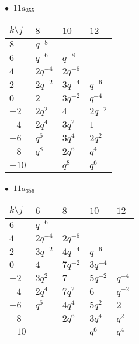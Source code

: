 \begin{minipage}{\linewidth}
$\bullet\ $ $11a_{355}$ \vspace{0.5em} \\
\begin{tabular}{l|lll}
$k \setminus j$ & $8$ & $10$ & $12$ \\
\hline
$8$ & $q^{-8}$ &  &  \\
$6$ & $q^{-6}$ & $q^{-8}$ &  \\
$4$ & $2q^{-4}$ & $2q^{-6}$ &  \\
$2$ & $2q^{-2}$ & $3q^{-4}$ & $q^{-6}$ \\
$0$ & $2$ & $3q^{-2}$ & $q^{-4}$ \\
$-2$ & $2q^{2}$ & $4$ & $2q^{-2}$ \\
$-4$ & $2q^{4}$ & $3q^{2}$ & $1$ \\
$-6$ & $q^{6}$ & $3q^{4}$ & $2q^{2}$ \\
$-8$ & $q^{8}$ & $2q^{6}$ & $q^{4}$ \\
$-10$ &  & $q^{8}$ & $q^{6}$ \\
\end{tabular}
\vspace{2em}
\end{minipage}
%
\begin{minipage}{\linewidth}
$\bullet\ $ $11a_{356}$ \vspace{0.5em} \\
\begin{tabular}{l|llll}
$k \setminus j$ & $6$ & $8$ & $10$ & $12$ \\
\hline
$6$ & $q^{-6}$ &  &  &  \\
$4$ & $2q^{-4}$ & $2q^{-6}$ &  &  \\
$2$ & $3q^{-2}$ & $4q^{-4}$ & $q^{-6}$ &  \\
$0$ & $4$ & $7q^{-2}$ & $3q^{-4}$ &  \\
$-2$ & $3q^{2}$ & $7$ & $5q^{-2}$ & $q^{-4}$ \\
$-4$ & $2q^{4}$ & $7q^{2}$ & $6$ & $q^{-2}$ \\
$-6$ & $q^{6}$ & $4q^{4}$ & $5q^{2}$ & $2$ \\
$-8$ &  & $2q^{6}$ & $3q^{4}$ & $q^{2}$ \\
$-10$ &  &  & $q^{6}$ & $q^{4}$ \\
\end{tabular}
\vspace{2em}
\end{minipage}
%
